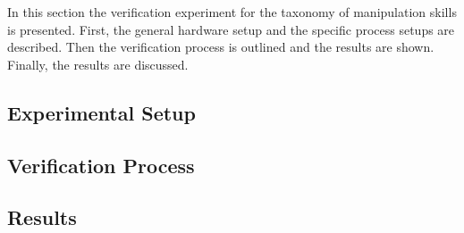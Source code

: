 In this section the verification experiment for the taxonomy of manipulation skills is presented.
First, the general hardware setup and the specific process setups are described. Then the verification process is outlined and the results are shown.
Finally, the results are discussed.

\subsection{Experimental Setup}

\subsection{Verification Process}

\subsection{Results}

